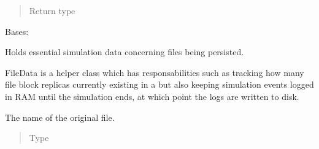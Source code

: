 \documentclass[letterpaper,10pt,english]{sphinxmanual}
\begin{document}
\begin{fulllineitems}
\begin{fulllineitems}
\begin{quote}
\begin{description}
\item[{Return type}] \leavevmode
{}

\end{description}\end{quote}

\end{fulllineitems}


\end{fulllineitems}


\begin{fulllineitems}
\label{\detokenize{app.domain.helpers:app.domain.helpers.smart_dataclasses.FileData}}
Bases: 

Holds essential simulation data concerning files being persisted.

FileData is a helper class which has responsabilities such as tracking
how many file block replicas currently existing in a
{\hyperref[\detokenize{app.domain:app.domain.cluster_groups.Cluster}]{}}
but also keeping simulation events logged in RAM until the simulation
ends, at which point the logs are written to disk.

\begin{fulllineitems}
\label{\detokenize{app.domain.helpers:app.domain.helpers.smart_dataclasses.FileData.name}}
The name of the original file.
\begin{quote}\begin{description}
\item[{Type}] \leavevmode
{}

\end{description}\end{quote}


\end{fulllineitems}
\end{fulllineitems}
\end{document}
